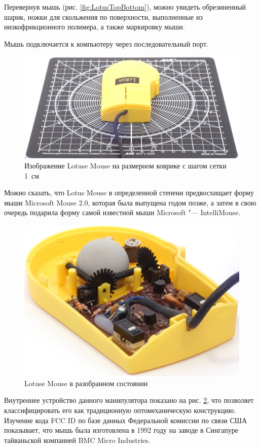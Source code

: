 \documentclass[11pt, a4paper]{article}
\begin{document}
Перевернув мышь (рис. \ref{fig:LotusTopBottom}), можно увидеть обрезиненный шарик, ножки для скольжения по поверхности, выполненные из низкофрикционного полимера, а также маркировку мыши.

Мышь подключается к компьютеру через последовательный порт.

\begin{figure}[h]
    \centering
    \includegraphics[scale=0.3]{1992_lotus_mouse/size_30.jpg}
    \caption{Изображение Lotuse Mouse на размерном коврике с шагом сетки 1~см}
    \label{fig:LotusSize}
\end{figure}

Можно сказать, что Lotus Mouse в определенной степени предвосхищает форму мыши Microsoft Mouse 2.0, которая была выпущена годом позже, а затем в свою очередь подарила форму самой известной мыши Microsoft "--- IntelliMouse.

\begin{figure}[h]
    \centering
    \includegraphics[scale=0.7]{1992_lotus_mouse/inside_30.jpg}
    \caption{Lotuse Mouse в разобранном состоянии}
    \label{fig:LotusInside}
\end{figure}

Внутреннее устройство данного манипулятора показано на рис. \ref{fig:LotusInside}, что позволяет классифицировать его как традиционную оптомеханическую конструкцию. Изучение кода FCC ID по базе данных Федеральной комиссии по связи США показывает, что мышь была изготовлена в 1992 году на заводе в Сингапуре тайваньской компанией BMC Micro Industries.
\end{document}
